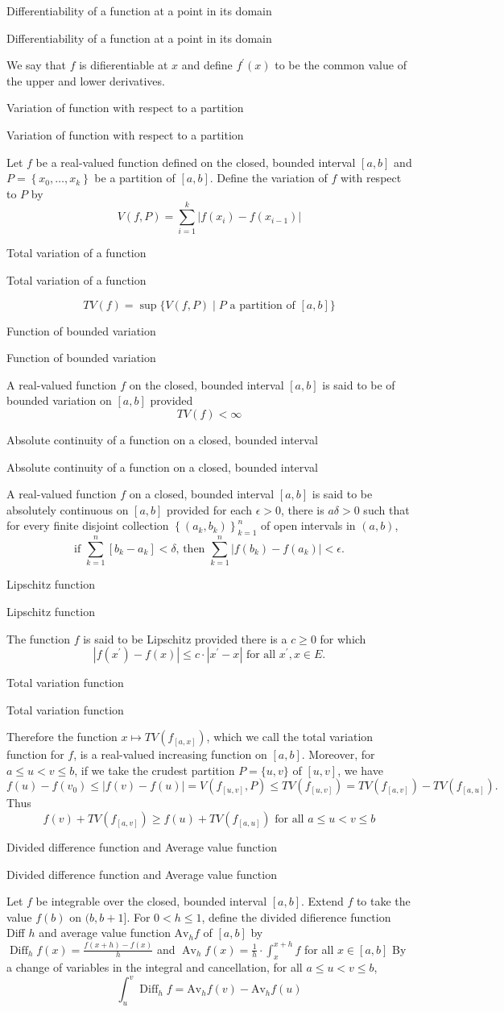 \documentclass[17pt]{extarticle}
\newcommand{\boxset}[2]{\begin{mdframed}[style=darkQuesion]
#1
\end{mdframed}
\newpage
\begin{mdframed}[style=darkQuesion]
#1
  \end{mdframed}
\begin{mdframed}[style=darkAnswer]
#2
  \end{mdframed}
  \newpage
}
\begin{document}
\boxset{Differentiability of a function at a point in its domain}
{
We say that $f$ is difierentiable at $x$ and define $f^{\prime}(x)$ to be the common value of the upper and lower derivatives.
}
\boxset{Variation of function with respect to a partition}
{
Let $f$ be a real-valued function defined on the closed, bounded interval $[a, b]$ and $P=\left\{x_{0}, \ldots, x_{k}\right\}$ be a partition of $[a, b]$. Define the variation of $f$ with respect to $P$ by
$$
V(f, P)=\sum_{i=1}^{k}\left|f\left(x_{i}\right)-f\left(x_{i-1}\right)\right|
$$
}
\boxset{Total variation of a function}
{
\[T V(f)=\sup \{V(f, P) \mid P \text { a partition of }[a, b]\}\]
}
\boxset{Function of bounded variation}
{
A real-valued function $f$ on the closed, bounded interval $[a, b]$ is said to be of bounded variation on $[a, b]$ provided
$$
T V(f)<\infty
$$
}
\boxset{Absolute continuity of a function on a closed, bounded interval}
{
A real-valued function $f$ on a closed, bounded interval $[a, b]$ is said to be absolutely continuous on $[a, b]$ provided for each $\epsilon>0$, there is $a \delta>0$ such that for every finite disjoint collection $\left\{\left(a_{k}, b_{k}\right)\right\}_{k=1}^{n}$ of open intervals in $(a, b)$,
$$
\text { if } \sum_{k=1}^{n}\left[b_{k}-a_{k}\right]<\delta \text {, then } \sum_{k=1}^{n}\left|f\left(b_{k}\right)-f\left(a_{k}\right)\right|<\epsilon \text {. }
$$
}
\boxset{Lipschitz function}
{
The function $f$ is said to be Lipschitz provided there is a $c \geq 0$ for which
$$
\left|f\left(x^{\prime}\right)-f(x)\right| \leq c \cdot\left|x^{\prime}-x\right| \text { for all } x^{\prime}, x \in E .
$$
}
\boxset{Total variation function}
{
Therefore the function $x \mapsto T V\left(f_{[a, x]}\right)$, which we call the total variation function for $f$, is a real-valued increasing function on $[a, b]$. Moreover, for $a \leq u<v \leq b$, if we take the crudest partition $P=\{u, v\}$ of $[u, v]$, we have
$$
f(u)-f\left(v_{0}\right) \leq|f(v)-f(u)|=V\left(f_{[u, v]}, P\right) \leq T V\left(f_{[u, v]}\right)=T V\left(f_{[a, v]}\right)-T V\left(f_{[a, u]}\right) .
$$
Thus
$$
f(v)+T V\left(f_{[a, v]}\right) \geq f(u)+T V\left(f_{[a, u]}\right) \text { for all } a \leq u<v \leq b
$$
}
\boxset{Divided difference function and Average value function}
{
Let $f$ be integrable over the closed, bounded interval $[a, b]$. Extend $f$ to take the value $f(b)$ on $(b, b+1]$. For $0<h \leq 1$, define the divided difierence function Diff $h$ and average value function $\mathrm{Av}_{h} f$ of $[a, b]$ by
$\operatorname{Diff}_{h} f(x)=\frac{f(x+h)-f(x)}{h}$ and $\operatorname{Av}_{h} f(x)=\frac{1}{h} \cdot \int_{x}^{x+h} f$ for all $x \in[a, b]$
By a change of variables in the integral and cancellation, for all $a \leq u<v \leq b$,
$$
\int_{u}^{v} \operatorname{Diff}_{h} f=\mathrm{Av}_{h} f(v)-\mathrm{Av}_{h} f(u)
$$
}
\end{document}
